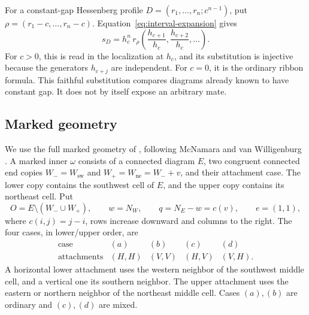 \documentclass[11pt,a4paper]{amsart}
\numberwithin{equation}{section}
\theoremstyle{plain}
\theoremstyle{definition}
\begin{document}
For a constant-gap Hessenberg profile \(D=(r_1,\ldots,r_n;c^{n-1})\),
put \(\rho=(r_1-c,\ldots,r_n-c)\).  Equation~\eqref{eq:interval-expansion}
gives
\begin{equation}\label{eq:constant-gap-substitution}
 s_D=h_c^n\,
 r_\rho\left(\frac{h_{c+1}}{h_c},
             \frac{h_{c+2}}{h_c},\ldots\right).
\end{equation}
For \(c>0\), this is read in the localization at \(h_c\), and its
substitution is injective because the generators \(h_{c+j}\) are
independent.  For \(c=0\), it is the ordinary ribbon formula.
This faithful substitution compares diagrams already known to have
constant gap.  It does not by itself expose an arbitrary mate.

\subsection{Marked geometry}\label{subsec:marked-geometry}

We use the full marked geometry of \cite{Shields2026Gluing}, following
McNamara and van Willigenburg \cite{McNamara2009Classification}.
A marked inner \(\omega\) consists of a connected diagram \(E\),
two congruent connected end copies \(W_-=W_{\mathrm{sw}}\) and
\(W_+=W_{\mathrm{ne}}=W_-+v\), and their attachment case.
The lower copy contains the southwest cell of \(E\), and the upper
copy contains its northeast cell.  Put
\[
 O=E\setminus(W_-\cup W_+),\qquad w=N_W,\qquad q=N_E-w=c(v),
 \qquad e=(1,1),
\]
where \(c(i,j)=j-i\), rows increase downward and columns to the right.
The four cases, in lower/upper order, are
\[
 \begin{array}{c|cccc}
 \text{case}&(a)&(b)&(c)&(d)\\ \hline
 \text{attachments}&(H,H)&(V,V)&(H,V)&(V,H).
 \end{array}
\]
A horizontal lower attachment uses the western neighbor of the
southwest middle cell, and a vertical one its southern neighbor.
The upper attachment uses the eastern or northern neighbor of the
northeast middle cell.  Cases \((a),(b)\) are ordinary and
\((c),(d)\) are mixed.
\end{document}
